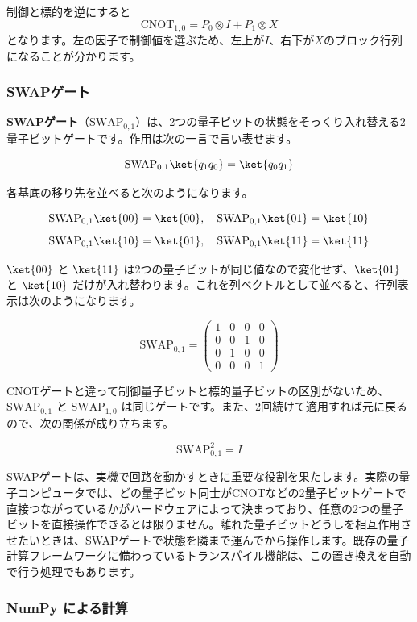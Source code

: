 制御と標的を逆にすると
\[
\mathrm{CNOT}_{1,0}=P_0\otimes I+P_1\otimes X
\]
となります。左の因子で制御値を選ぶため、左上が$I$、右下が$X$のブロック行列になることが分かります。

\subsubsection{SWAPゲート}

\textbf{SWAPゲート}（$\mathrm{SWAP}_{0,1}$）は、2つの量子ビットの状態をそっくり入れ替える2量子ビットゲートです。作用は次の一言で言い表せます。

\[
\mathrm{SWAP}_{0,1} \ket{q_1 q_0} = \ket{q_0 q_1}
\]

各基底の移り先を並べると次のようになります。

\[
\mathrm{SWAP}_{0,1} \ket{00} = \ket{00}, \quad \mathrm{SWAP}_{0,1} \ket{01} = \ket{10}
\]
\[
\mathrm{SWAP}_{0,1} \ket{10} = \ket{01}, \quad \mathrm{SWAP}_{0,1} \ket{11} = \ket{11}
\]

$\ket{00}$ と $\ket{11}$ は2つの量子ビットが同じ値なので変化せず、$\ket{01}$ と $\ket{10}$ だけが入れ替わります。これを列ベクトルとして並べると、行列表示は次のようになります。

\[
\mathrm{SWAP}_{0,1} = \begin{pmatrix}
1 & 0 & 0 & 0 \\
0 & 0 & 1 & 0 \\
0 & 1 & 0 & 0 \\
0 & 0 & 0 & 1
\end{pmatrix}
\]

CNOTゲートと違って制御量子ビットと標的量子ビットの区別がないため、$\mathrm{SWAP}_{0,1}$ と $\mathrm{SWAP}_{1,0}$ は同じゲートです。また、2回続けて適用すれば元に戻るので、次の関係が成り立ちます。

\[
\mathrm{SWAP}_{0,1}^2 = I
\]

\begin{notebox}
SWAPゲートは、実機で回路を動かすときに重要な役割を果たします。実際の量子コンピュータでは、どの量子ビット同士がCNOTなどの2量子ビットゲートで直接つながっているかがハードウェアによって決まっており、任意の2つの量子ビットを直接操作できるとは限りません。離れた量子ビットどうしを相互作用させたいときは、SWAPゲートで状態を隣まで運んでから操作します。既存の量子計算フレームワークに備わっているトランスパイル機能は、この置き換えを自動で行う処理でもあります。
\end{notebox}

\subsubsection{NumPy による計算}

